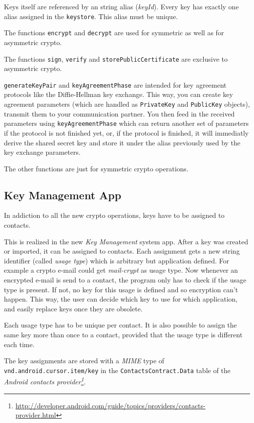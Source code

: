 \documentclass[a4paper,draft]{scrartcl}
\begin{document}
		Keys itself are referenced by an string alias (\emph{keyId}). Every key has exactly one alias assigned in the \texttt{keystore}. This alias must be unique.
	
		The functions \texttt{encrypt} and \texttt{decrypt} are used for symmetric as well as for asymmetric crypto.

		The functions \texttt{sign}, \texttt{verify} and \texttt{storePublicCertificate} are exclusive to asymmetric crypto.

		\texttt{generateKeyPair} and \texttt{keyAgreementPhase} are intended for key agreement protocols like the Diffie-Hellman key exchange. This way, you can create key agreement parameters (which are handled as \texttt{PrivateKey} and \texttt{PublicKey} objects), transmit them to your communication partner. You then feed in the received parameters using \texttt{keyAgreementPhase} which can return another set of parameters if the protocol is not finished yet, or, if the protocol is finished, it will immediatly derive the shared secret key and store it under the alias previously used by the key exchange parameters.

		The other functions are just for symmetric crypto operations.
	
	\subsection{Key Management App}
		In addiction to all the new crypto operations, keys have to be assigned to contacts.

		This is realized in the new {\em Key Management} system app. After a key was created or imported, it can be assigned to contacts. Each assignment gets a new string identifier (called {\em usage type}) which is arbitrary but application defined. For example a crypto e-mail could get \textit{mail-crypt} as usage type. Now whenever an encrypted e-mail is send to a contact, the program only has to check if the usage type is present. If not, no key for this usage is defined and so encryption can't happen. This way, the user can decide which key to use for which application, and easily replace keys once they are obsolete.
		
		Each usage type has to be unique per contact. It is also possible to assign the same key more than once to a contact, provided that the usage type is different each time.

		The key assignments are stored with a {\em MIME} type of \texttt{vnd.android.cursor.item/key} in the \texttt{ContactsContract.Data} table of the {\em Android contacts provider\footnote{\url{http://developer.android.com/guide/topics/providers/contacts-provider.html}}}.
		
\end{document}
